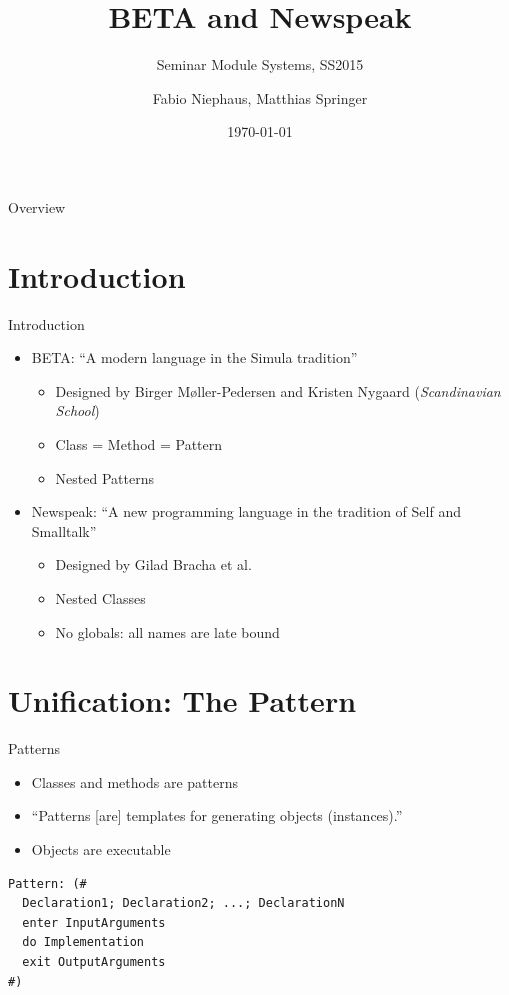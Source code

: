 \documentclass[xcolor=dvipsname, handout]{beamer} %
\title{BETA and Newspeak}
\subtitle{Seminar Module Systems, SS2015}
\author{Fabio Niephaus, Matthias Springer}
\date{\today}
\institute[2012]{Hasso Plattner Institute, Software Architecture Group}
\begin{document}
\begin{frame}[plain]
	\maketitle
\end{frame}
\begin{frame}{Overview}
	\tableofcontents[hideallsubsections]
\end{frame}


\section{Introduction}

\begin{frame}{Introduction}
\begin{itemize}
    \item BETA: ``A modern language in the Simula tradition''
    \begin{itemize}
      \item Designed by Birger Møller-Pedersen and Kristen Nygaard (\emph{Scandinavian School})
      \item Class = Method = Pattern
      \item Nested Patterns
    \end{itemize}
    \item Newspeak: ``A new programming language in the tradition of Self and Smalltalk''
    \begin{itemize}
      \item Designed by Gilad Bracha et al.
      \item Nested Classes
      \item No globals: all names are late bound
    \end{itemize}
\end{itemize}
\end{frame}

\section{Unification: The Pattern}

\begin{frame}[fragile]{Patterns}
\begin{itemize}
  \item Classes and methods are patterns
  \item ``Patterns [are] templates for generating objects (instances).''
  \item Objects are executable
\end{itemize}
\vfill
\begin{verbatim}
Pattern: (# 
  Declaration1; Declaration2; ...; DeclarationN
  enter InputArguments
  do Implementation
  exit OutputArguments
#)
\end{verbatim}
\end{frame}
\end{document}
